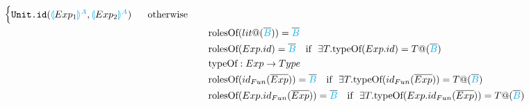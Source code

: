 \documentclass[11pt]{jarticle}
\newcommand{\projection}[2]{{\color{cyan}\llparenthesis}#1{\color{cyan}\rrparenthesis^#2}}
\begin{document}
\begin{alignat*}{2}
\begin{cases}
    \texttt{Unit.id}(\projection{Exp_1}{A}, \projection{Exp_2}{A})  ~~~~~\color{black} \text{otherwise}
  \end{cases}\\
  &&&\text{rolesOf}(lit@(\overline{\color{cyan}B})) = {\overline{\color{cyan}B}}\\
  &&&\text{rolesOf}(Exp.id) = \overline{\color{cyan}B}~~~\text{if}~~\exists T.\text{typeOf}(Exp.id) = T@(\overline{\color{cyan}B})\\
  &&&\text{typeOf}:Exp \rightarrow Type\\
  &&&\text{rolesOf}(id_{Fun}(\overline{Exp})) = \overline{\color{cyan}B}~~~\text{if}~~\exists T.\text{typeOf}(id_{Fun}(\overline{Exp})) = T@(\overline{\color{cyan}B})\\
  &&&\text{rolesOf}(Exp.id_{Fun}(\overline{Exp})) = \overline{\color{cyan}B}~~~\text{if}~~\exists T.\text{typeOf}(Exp.id_{Fun}(\overline{Exp})) = T@(\overline{\color{cyan}B})\\
\end{alignat*}
\end{document}
